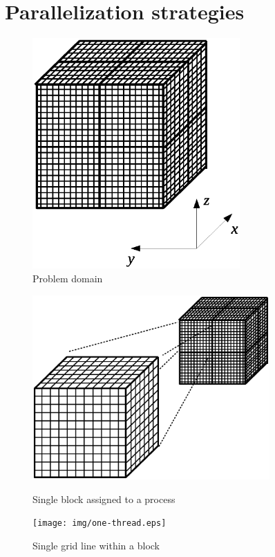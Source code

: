 \documentclass{article}
\begin{document}
\section{Parallelization strategies}


    \begin{figure}[h]
    \begin{center}
    \includegraphics[trim={{100pt} {150pt} {100pt} {150pt}}, clip, height=250pt]{img/domain.eps}
    \end{center}
    \caption{Problem domain}
    \label{fig:domain}
    \end{figure}

    \begin{figure}[ht]
    \begin{minipage}[b]{0.45\linewidth}
    \centering
    \includegraphics[trim={{50pt} {150pt} {50pt} {150pt}}, clip, height=200pt]{img/one-block.eps}
    \caption{Single block assigned to a process}
    \label{fig:block}
    \end{minipage}

    \hspace{0.5cm}
    \begin{minipage}[b]{0.45\linewidth}
    \centering
    \texttt{[image: img/one-thread.eps]}
    \caption{Single grid line within a block}
    \label{fig:grid-line}
    \end{minipage}
    \end{figure}
\end{document}
